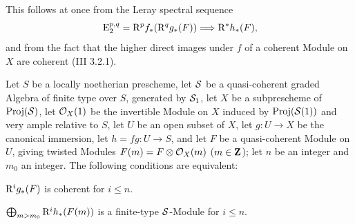 This follows at once from the Leray spectral sequence
\steco
\begin{equation} \label{eq:XII.26} {} \operatorname{E}_2^{p, q}=\mathrm R^pf_\ast(\mathrm R^qg_\ast(F)) \Longrightarrow \mathrm R^\ast h_\ast(F),
\end{equation}
and from the fact that the higher direct images under $f$ of a coherent Module on $X$ are coherent (\EGA III 3.2.1).

\begin{proposition} \label{XII.5.2}
Let $S$ be a locally noetherian prescheme, let $\mathcal S$ be a quasi-coherent graded Algebra of finite type over $S$, generated by $\mathcal S_1$, let $X$ be a subprescheme of $\operatorname{Proj}(\mathcal S)$, let $\mathcal O_X(1)$ be the invertible Module on $X$ induced by $\operatorname{Proj}(\mathcal S(1))$ and very ample relative to $S$, let $U$ be an open subset of $X$, let $g:U\to X$ be the canonical immersion, let $h=fg:U\to S$, and let $F$ be a quasi-coherent Module on $U$, giving twisted Modules $F(m)=F\otimes \mathcal O_X(m)$\sisi{)}{} ($m\in\mathbf Z$); let $n$ be an integer and $m_0$ an integer. The following conditions are equivalent:
\begin{enumeratei}
\item
$\mathrm R^ig_\ast(F)$ is coherent for $i\leq n$.
\item
$\bigoplus_{m>m_0}\mathrm R^ih_\ast(F(m))$ is a finite-type $\mathcal S$-Module for $i\leq n$.
\end{enumeratei}
\end{proposition}

